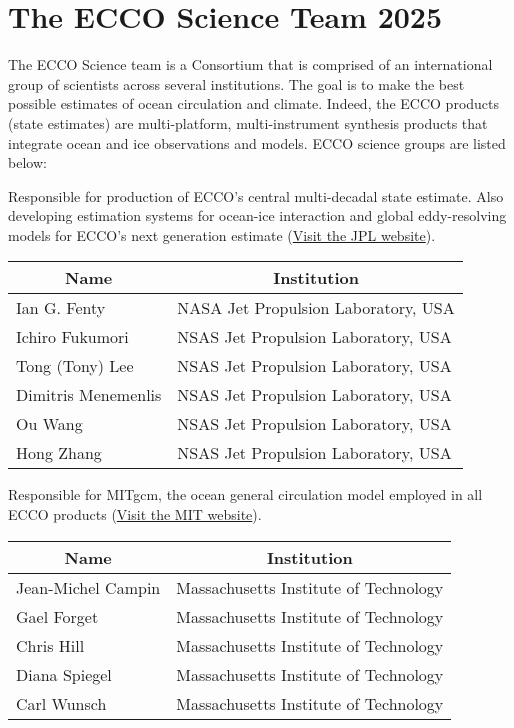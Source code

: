 \pagebreak
\section{The ECCO Science Team 2025}
The ECCO Science team is a Consortium that is comprised of an international group of scientists across several institutions. The goal is to make the best possible estimates of ocean circulation and climate. Indeed, the ECCO products (state estimates) are multi-platform, multi-instrument synthesis products that integrate ocean and ice observations and models. ECCO science groups are listed below:


\vspace{.5cm}
Responsible for production of ECCO's central multi-decadal state estimate. Also developing estimation systems for ocean-ice interaction and global eddy-resolving models for ECCO's next generation estimate (\hyperlink{https://www.jpl.nasa.gov/}{Visit the JPL website}).

\vspace{.25cm}
\begin{center}
\begin{tabular}{ m{} m{}}
    \multicolumn{1}{c}{\textbf{Name}} & \multicolumn{1}{c}{\textbf{Institution}} \\ \hline
    Ian G. Fenty & NASA Jet Propulsion Laboratory, USA\\ \hline
    Ichiro Fukumori & NSAS Jet Propulsion Laboratory, USA \\ \hline
    Tong (Tony) Lee & NSAS Jet Propulsion Laboratory, USA \\ \hline
    Dimitris Menemenlis & NSAS Jet Propulsion Laboratory, USA \\ \hline
    Ou Wang & NSAS Jet Propulsion Laboratory, USA \\ \hline
    Hong Zhang & NSAS Jet Propulsion Laboratory, USA \\ \hline
\end{tabular}
\end{center}

\vspace{.25cm}
Responsible for MITgcm, the ocean general circulation model employed in all ECCO products (\hyperlink{http://web.mit.edu/}{Visit the MIT website}).

\vspace{.25cm}
\begin{center}
\begin{tabular}{m{} m{} }
    \multicolumn{1}{c}{\textbf{Name}} & \multicolumn{1}{c}{\textbf{Institution}} \\ \hline
    Jean-Michel Campin & Massachusetts Institute of Technology \\ \hline
    Gael Forget & Massachusetts Institute of Technology \\ \hline
    Chris Hill & Massachusetts Institute of Technology \\ \hline
    Diana Spiegel & Massachusetts Institute of Technology \\ \hline
    Carl Wunsch & Massachusetts Institute of Technology \\ \hline
\end{tabular}
\end{center}

